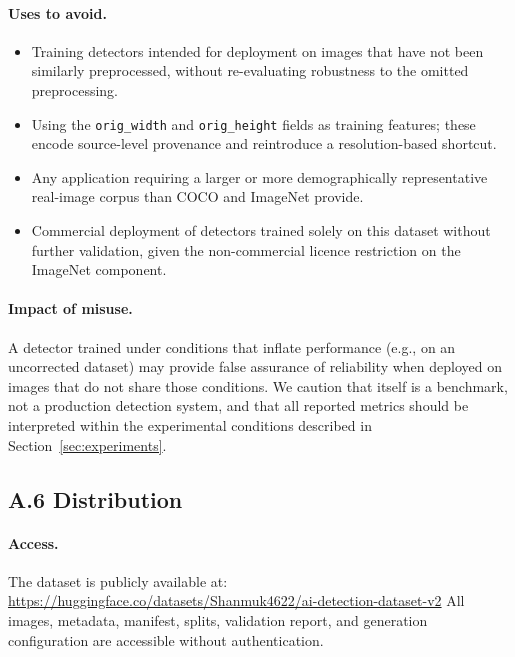 \paragraph{Uses to avoid.}
\begin{itemize}[leftmargin=1.5em, itemsep=2pt]
  \item Training detectors intended for deployment on images that have
    not been similarly preprocessed, without re-evaluating robustness
    to the omitted preprocessing.
  \item Using the \texttt{orig\_width} and \texttt{orig\_height} fields
    as training features; these encode source-level provenance and
    reintroduce a resolution-based shortcut.
  \item Any application requiring a larger or more demographically
    representative real-image corpus than COCO and ImageNet provide.
  \item Commercial deployment of detectors trained solely on this
    dataset without further validation, given the non-commercial
    licence restriction on the ImageNet component.
\end{itemize}

\paragraph{Impact of misuse.}
A detector trained under conditions that inflate performance
(e.g., on an uncorrected dataset) may provide false assurance
of reliability when deployed on images that do not share those
conditions.
We caution that \textbf{\datasetname} itself is a benchmark, not a
production detection system, and that all reported metrics should
be interpreted within the experimental conditions described in
Section~\ref{sec:experiments}.

\subsection*{A.6 \quad Distribution}
\label{ssec:ds_distribution}

\paragraph{Access.}
The dataset is publicly available at:\\
\url{https://huggingface.co/datasets/Shanmuk4622/ai-detection-dataset-v2}
All images, metadata, manifest, splits, validation report, and
generation configuration are accessible without authentication.

